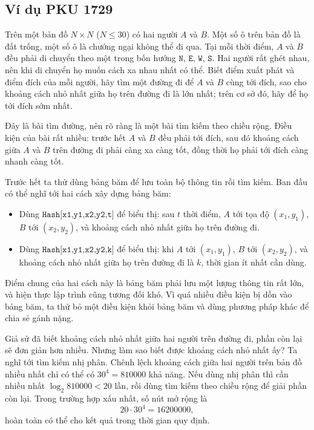 \documentclass[11pt]{article}
\begin{document}
\subsection{Ví dụ PKU 1729}

Trên một bản đồ \(N\times N\) (\(N\le 30\)) có hai người \(A\) và \(B\). Một
số ô trên bản đồ là đất trống, một số ô là chướng ngại không thể đi qua. Tại
mỗi thời điểm, \(A\) và \(B\) đều phải di chuyển theo một trong bốn hướng
\(\texttt{N}\), \(\texttt{E}\), \(\texttt{W}\), \(\texttt{S}\). Hai người rất
ghét nhau, nên khi di chuyển họ muốn cách xa nhau nhất có thể. Biết điểm xuất
phát và điểm đích của mỗi người, hãy tìm một đường đi để \(A\) và \(B\) cùng
tới đích, sao cho khoảng cách nhỏ nhất giữa họ trên đường đi là lớn nhất; trên
cơ sở đó, hãy để họ tới đích sớm nhất.

Đây là bài tìm đường, nên rõ ràng là một bài tìm kiếm theo chiều rộng. Điều
kiện của bài rất nhiều: trước hết \(A\) và \(B\) đều phải tới đích, sau đó
khoảng cách giữa \(A\) và \(B\) trên đường đi phải càng xa càng tốt, đồng
thời họ phải tới đích càng nhanh càng tốt.

Trước hết ta thử dùng bảng băm để lưu toàn bộ thông tin rồi tìm kiếm. Ban đầu
có thể nghĩ tới hai cách xây dựng bảng băm:
\begin{itemize}
  \item Dùng \(\texttt{Hash[x1,y1,x2,y2,t]}\) để biểu thị: sau \(t\) thời
  điểm, \(A\) tới tọa độ \((x_1,y_1)\), \(B\) tới \((x_2,y_2)\), và khoảng
  cách nhỏ nhất giữa họ trên đường đi.
  \item Dùng \(\texttt{Hash[x1,y1,x2,y2,k]}\) để biểu thị: khi \(A\) tới
  \((x_1,y_1)\), \(B\) tới \((x_2,y_2)\), và khoảng cách nhỏ nhất giữa họ trên
  đường đi là \(k\), thời gian ít nhất cần dùng.
\end{itemize}

Điểm chung của hai cách này là bảng băm phải lưu một lượng thông tin rất lớn,
và hiện thực lập trình cũng tương đối khó. Vì quá nhiều điều kiện bị dồn vào
bảng băm, ta thử bỏ một điều kiện khỏi bảng băm và dùng phương pháp khác để
chia sẻ gánh nặng.

Giả sử đã biết khoảng cách nhỏ nhất giữa hai người trên đường đi, phần còn
lại sẽ đơn giản hơn nhiều. Nhưng làm sao biết được khoảng cách nhỏ nhất ấy?
Ta nghĩ tới tìm kiếm nhị phân. Chênh lệch khoảng cách giữa hai người trên bản
đồ nhiều nhất chỉ có thể có \(30^4=810000\) khả năng. Nếu dùng nhị phân thì
cần nhiều nhất \(\log_2 810000<20\) lần, rồi dùng tìm kiếm theo chiều rộng để
giải phần còn lại. Trong trường hợp xấu nhất, số nút mở rộng là
\[
  20\cdot 30^4 = 16200000,
\]
hoàn toàn có thể cho kết quả trong thời gian quy định.
\end{document}
